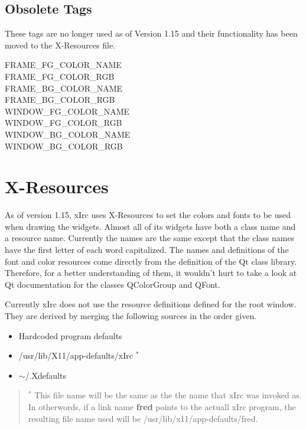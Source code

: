 \documentclass[titlepage]{article}
\begin{document}
\subsection{Obsolete Tags}
These tags are no longer used as of Version 1.15 and their
functionality has been moved to the X-Resources file. 
\begin{description}
\item[FRAME\_FG\_COLOR\_NAME]
\item[FRAME\_FG\_COLOR\_RGB]
\item[FRAME\_BG\_COLOR\_NAME]
\item[FRAME\_BG\_COLOR\_RGB]
\item[WINDOW\_FG\_COLOR\_NAME]
\item[WINDOW\_FG\_COLOR\_RGB]
\item[WINDOW\_BG\_COLOR\_NAME]
\item[WINDOW\_BG\_COLOR\_RGB]
\end{description}

\section{X-Resources}
As of version 1.15, xIrc uses X-Resources to set the colors and fonts
to be used when drawing the widgets. Almost all of its widgets have
both a class name and a resource name. Currently the names are the
same except that the class names have the first letter of each word
capitalized. The names and definitions of the font and color resources
come directly from the definition of the Qt class library. Therefore,
for a better understanding of them, it wouldn't hurt to take a look
at Qt documentation for the classes QColorGroup and QFont.

Currently xIrc does not use the resource definitions defined for the
root window. They are derived by merging the following sources in the
order given.
\begin{itemize}
\item Hardcoded program defaults
\item /usr/lib/X11/app-defaults/xIrc $^*$
\item $\sim$/.Xdefaults
\end{itemize}
\begin{quote}
$^*$ This file name will be the same as the the name that xIrc was
invoked as. In otherwords, if a link name \textbf{fred} points to the
actuall xIrc program, the resulting file name used will be
/usr/lib/x11/app-defaults/fred.
\end{quote}
\end{document}
